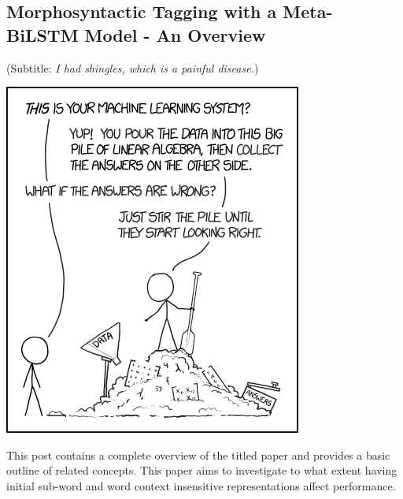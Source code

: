\documentclass[11pt]{article}
\begin{document}
\subsection{Morphosyntactic Tagging with a Meta-BiLSTM Model - An Overview}
\label{sec:org44dbf12}
(Subtitle: \emph{I had shingles, which is a painful disease.})
\begin{center}
\includegraphics[width=.9\linewidth]{assets/machine_learning.png}
\end{center}

This post contains a complete overview of the titled paper and provides a basic outline of related concepts. This paper aims to investigate to what extent having initial sub-word and word context insensitive representations affect performance.
\end{document}
